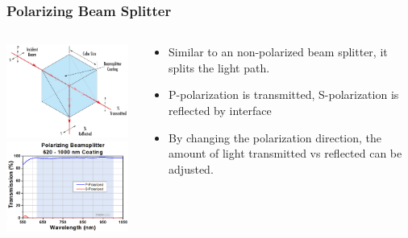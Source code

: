 \documentclass{beamer}
\begin{document}
\begin{frame}\frametitle{Polarizing Beam Splitter}
\begin{columns}
\begin{column}{5cm}
\begin{center}
\includegraphics[width=4cm]{fig/pbsEd.jpg}
\includegraphics[width=4cm]{fig/PBS252.png}
\end{center}
\end{column}
\begin{column}{6cm}
\begin{itemize}
\item Similar to an non-polarized beam splitter, it splits the light path.
\item P-polarization is transmitted, S-polarization is reflected by interface
\item By changing the polarization direction, the amount of light transmitted vs reflected can be adjusted.
\end{itemize}
\end{column}
\end{columns}
\end{frame}
\end{document}
